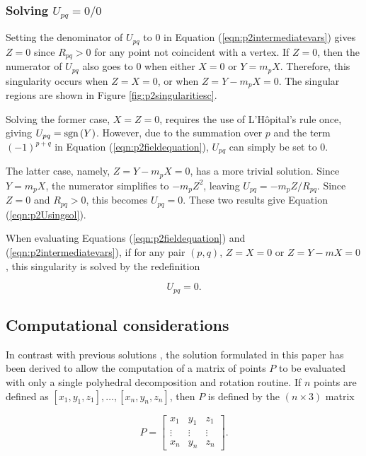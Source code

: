 \subsubsection{Solving \(U_{pq} = 0/0\)}

Setting the denominator of \(U_{pq}\) to 0 in Equation (\ref{eqn:p2intermediatevars}) gives \(Z = 0\) since \(R_{pq} > 0\) for any point not coincident with a vertex. If \(Z = 0\), then the numerator of \(U_{pq}\) also goes to 0 when either \(X = 0\) or \(Y = m_pX\). Therefore, this singularity occurs when \(Z = X = 0\), or when \(Z = Y - m_pX = 0\). The singular regions are shown in Figure \ref{fig:p2singularitiesc}.

Solving the former case, \(X = Z = 0\), requires the use of L'H\^{o}pital's rule once, giving \(U_{pq} = \operatorname{\text{sgn}}\left(Y\right)\). However, due to the summation over \(p\) and the term \(\left(-1\right)^{p+q}\) in Equation (\ref{eqn:p2fieldequation}), \(U_{pq}\) can simply be set to 0.

The latter case, namely, \(Z = Y - m_pX = 0\), has a more trivial solution. Since \(Y = m_pX\), the numerator simplifies to \(-m_pZ^2\), leaving \(U_{pq} = -m_pZ/R_{pq}\). Since \(Z = 0\) and \(R_{pq} > 0\), this becomes \(U_{pq} = 0\). These two results give Equation (\ref{eqn:p2Usingsol}).

When evaluating Equations (\ref{eqn:p2fieldequation}) and (\ref{eqn:p2intermediatevars}), if for any pair \(\left(p,q\right)\), \(Z = X = 0\) or \(Z = Y-mX = 0\), this singularity is solved by the redefinition

\begin{equation}\label{eqn:p2Usingsol}
U_{pq} = 0 \text{.}
\end{equation}

\subsection{Computational considerations}

In contrast with previous solutions \cite{Rubeck2013,OConnell2020}, the solution formulated in this paper has been derived to allow the computation of a matrix of points \(P\) to be evaluated with only a single polyhedral decomposition and rotation routine. If \(n\) points are defined as \(\left[x_1, y_1, z_1\right], \dotsc, \left[x_n, y_n, z_n\right]\), then \(P\) is defined by the \(\left( n \times 3\right)\) matrix

\begin{equation}
P = \begin{bmatrix}
x_1 & y_1 & z_1 \\
\vdots & \vdots & \vdots \\
x_n & y_n & z_n
\end{bmatrix} \text{.}
\end{equation}

